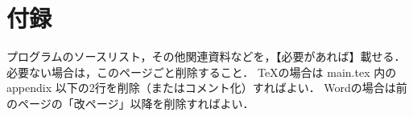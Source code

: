 \chapter*{付録}	%
\thispagestyle{plain}   %

プログラムのソースリスト，その他関連資料などを，【必要があれば】載せる．
必要ない場合は，このページごと削除すること．
\TeX の場合は main.tex 内の \yen appendix 以下の2行を削除（またはコメント化）すればよい．
Wordの場合は前のページの「改ページ」以降を削除すればよい．
